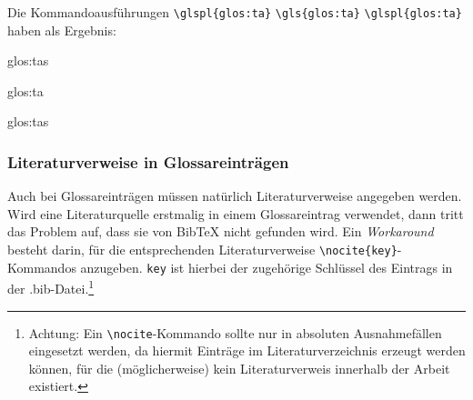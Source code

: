 Die Kommandoausf\"uhrungen \verb+\glspl{glos:ta}+ \verb+\gls{glos:ta}+  \verb+\glspl{glos:ta}+ haben als 
Ergebnis:

\begin{seList}
\item \glspl{glos:ta}
\item \gls{glos:ta}
\item \glspl{glos:ta}
\end{seList}

\subsubsection{Literaturverweise in Glossareinträgen}

Auch bei Glossareinträgen müssen natürlich Literaturverweise angegeben werden. 
Wird eine Literaturquelle erstmalig in einem Glossareintrag verwendet, dann tritt das Problem auf, 
dass sie von BibTeX nicht gefunden wird. Ein \textsl{Workaround} besteht darin, für die entsprechenden 
Literaturverweise \verb+\nocite{key}+-Kommandos anzugeben. \verb+key+ ist hierbei der zugehörige Schlüssel 
des Eintrags in der .bib-Datei.\footnote{Achtung: Ein \texttt{\textbackslash{}nocite}-Kommando sollte nur in absoluten Ausnahmefällen 
eingesetzt werden, da hiermit Einträge im Literaturverzeichnis erzeugt werden können, für die (möglicherweise) kein 
Literaturverweis innerhalb der Arbeit existiert.}

\newpage

 